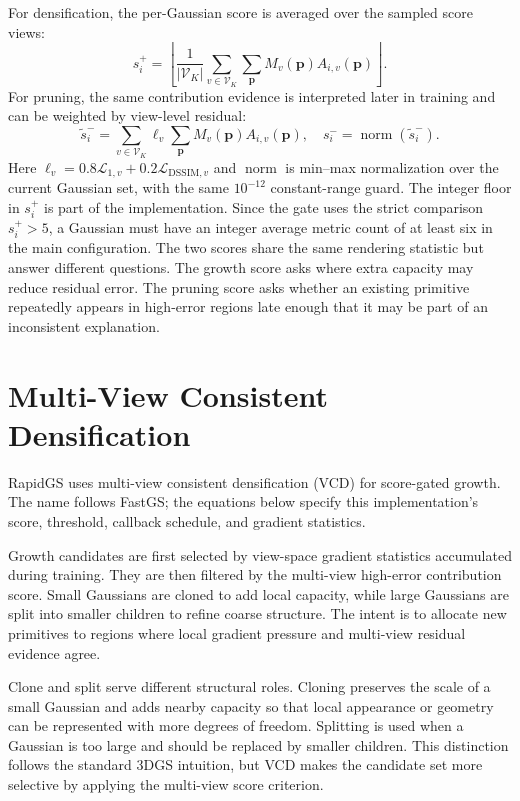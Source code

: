 For densification, the per-Gaussian score is averaged over the sampled score views:
\begin{equation}
s_i^{+}
=
\left\lfloor
\frac{1}{|\mathcal{V}_K|}
\sum_{v\in\mathcal{V}_K}
\sum_{\mathbf{p}}M_v(\mathbf{p})A_{i,v}(\mathbf{p})
\right\rfloor .
\end{equation}
For pruning, the same contribution evidence is interpreted later in training and can be weighted by view-level residual:
\begin{equation}
\tilde{s}_i^{-}
=
\sum_{v\in\mathcal{V}_K}
\ell_v
\sum_{\mathbf{p}}M_v(\mathbf{p})A_{i,v}(\mathbf{p}),
\quad
s_i^{-}=\operatorname{norm}(\tilde{s}_i^{-}).
\end{equation}
Here $\ell_v=0.8\mathcal{L}_{1,v}+0.2\mathcal{L}_{\mathrm{DSSIM},v}$ and $\operatorname{norm}$ is min--max normalization over the current Gaussian set, with the same $10^{-12}$ constant-range guard. The integer floor in $s_i^{+}$ is part of the implementation. Since the gate uses the strict comparison $s_i^{+}>5$, a Gaussian must have an integer average metric count of at least six in the main configuration. The two scores share the same rendering statistic but answer different questions. The growth score asks where extra capacity may reduce residual error. The pruning score asks whether an existing primitive repeatedly appears in high-error regions late enough that it may be part of an inconsistent explanation.

\section{Multi-View Consistent Densification}

RapidGS uses multi-view consistent densification (VCD) for score-gated growth.
The name follows FastGS; the equations below specify this implementation's
score, threshold, callback schedule, and gradient statistics.

Growth candidates are first selected by view-space gradient statistics accumulated during training. They are then filtered by the multi-view high-error contribution score. Small Gaussians are cloned to add local capacity, while large Gaussians are split into smaller children to refine coarse structure. The intent is to allocate new primitives to regions where local gradient pressure and multi-view residual evidence agree.

Clone and split serve different structural roles. Cloning preserves the scale of a small Gaussian and adds nearby capacity so that local appearance or geometry can be represented with more degrees of freedom. Splitting is used when a Gaussian is too large and should be replaced by smaller children. This distinction follows the standard 3DGS intuition, but VCD makes the candidate set more selective by applying the multi-view score criterion.


